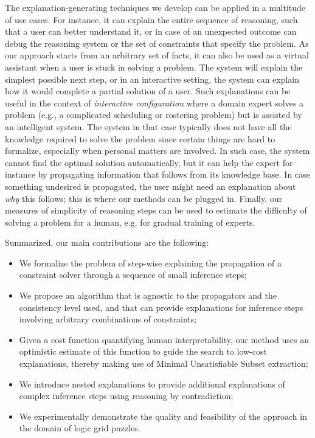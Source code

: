 The explanation-generating techniques we develop can be applied in a multitude of use cases. 
For instance, it can explain the entire sequence of reasoning, such that a user can better understand it, or in case of an unexpected outcome can debug the reasoning system or the set of constraints that specify the problem. 
As our approach starts from an arbitrary set of facts, it can also be used as a virtual assistant when a user is stuck in solving a problem.
The system will explain the simplest possible next step, or in an interactive setting, the system can explain how it would complete a partial solution of a user. Such explanations can be useful in the context of  \emph{interactive configuration} \cite{felfernig2014knowledge} where a domain expert solves a problem (e.g., a complicated scheduling or rostering problem) but is assisted by an intelligent system. 
The system in that case typically does not have all the knowledge required to solve the problem since certain things are hard to formalize, especially when personal matters are involved. In such case, the system cannot find the optimal solution automatically, but it can help the expert for instance by propagating information that follows from its knowledge base. In case something undesired is propagated, the user might need an explanation about \emph{why} this follows; this is where our methods can be plugged in.
% 
% 
Finally, our measures of simplicity of reasoning steps can be used to estimate the difficulty of solving a problem for a human, e.g. for gradual training of experts.


Summarized, our main contributions are the following:
\begin{itemize}
	\item We formalize the problem of step-wise explaining the propagation of a constraint solver through a sequence of small inference steps;
	\item We propose an algorithm that is agnostic to the propagators and the consistency level used, and that can provide explanations for inference steps involving arbitrary combinations of constraints;
	\item Given a cost function quantifying human interpretability, our method uses an optimistic estimate of this function to guide the search to low-cost explanations, thereby making use of Minimal Unsatisfiable Subset extraction;
	\item We introduce nested explanations to provide additional explanations of complex inference steps using reasoning by contradiction;
	\item We experimentally demonstrate the quality and feasibility of the approach in the domain of logic grid puzzles.
\end{itemize}


